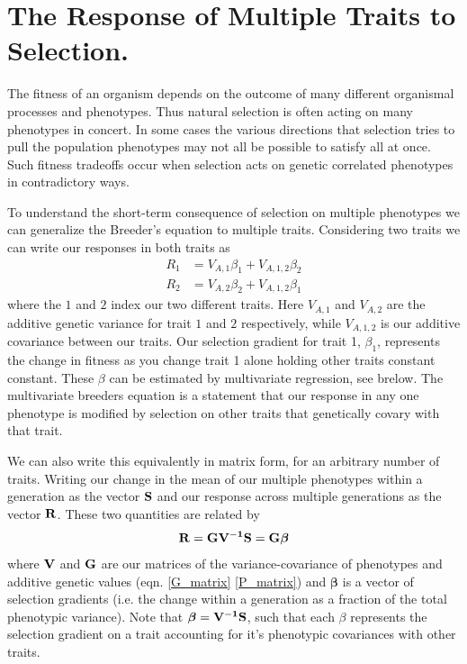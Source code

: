 
\chapter{The Response of Multiple Traits to Selection.}
The fitness of an organism depends on the outcome of many different
organismal processes and phenotypes. Thus natural selection is often acting on many
phenotypes in concert. In some cases the various directions that selection
tries to pull the population phenotypes may not all be possible to
satisfy all at once. Such fitness tradeoffs occur when selection acts on genetic correlated phenotypes in 
contradictory ways. 

To understand the short-term consequence of selection on multiple
phenotypes we can generalize the Breeder's equation  to multiple traits\cite{lande:79}. Considering two traits we can write our responses in both traits as
\begin{eqnarray}
R_1 & = V_{A,1} \beta_1 + V_{A,1,2} \beta_2 \nonumber \\
R_2 & = V_{A,2} \beta_2 + V_{A,1,2} \beta_1  \label{eqn:2D_breeders_eqn}
\end{eqnarray}
where the $1$ and $2$ index our two different traits. Here $V_{A,1} $
and $ V_{A,2}$ are the additive genetic variance for trait $1$ and $2$
respectively, while $V_{A,1,2}$ is our additive covariance between our
traits. Our selection gradient for trait 1, $\beta_1$, represents the
change in fitness as you change trait 1 alone holding other traits
constant constant. These $\beta$ can be estimated by multivariate
regression, see brelow. 
The multivariate breeders equation is a statement that our response in
any one phenotype is modified by selection on other traits that
genetically covary with that trait. 

We can also write this equivalently in matrix form, for an arbitrary
number of traits. Writing our change in the mean of our multiple phenotypes within a generation as the vector $\bf{S}$ and our response across multiple generations as
the vector $\bf{R}$. These two quantities are related by 
\begin{equation}
\bf{R} = \bf{G} \bf{V}^{-1} \bf{S} = \bf{G} \boldsymbol{ \beta} \label{eqn:MV_breeders_eqn}
\end{equation}
 where $\bf{V}$ and $\bf{G}$ are our matrices of the
 variance-covariance of phenotypes and additive genetic values
 (eqn. \eqref{G_matrix} \eqref{P_matrix}) and
 $\boldsymbol{\beta}$ is a vector of selection gradients (i.e. the
 change within a generation as a fraction of the total phenotypic
 variance). Note that $\boldsymbol{\beta} = \bf{V}^{-1} \bf{S} $, such
 that each $\beta$ represents the selection gradient on a trait
 accounting for it's phenotypic covariances with other traits. 

